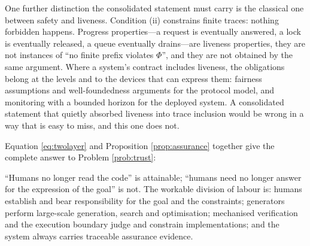 One further distinction the consolidated statement must carry is the classical one between safety and
liveness. Condition (ii) constrains finite traces: nothing forbidden happens. Progress properties---a
request is eventually answered, a lock is eventually released, a queue eventually drains---are
liveness properties, they are not instances of ``no finite prefix violates $\Phi$'', and they are not
obtained by the same argument. Where a system's contract includes liveness, the obligations belong at
the levels and to the devices that can express them: fairness assumptions and well-foundedness
arguments for the protocol model, and monitoring with a bounded horizon for the deployed system. A
consolidated statement that quietly absorbed liveness into trace inclusion would be wrong in a way
that is easy to miss, and this one does not.

Equation \eqref{eq:twolayer} and Proposition \ref{prop:assurance} together give the complete
answer to Problem \ref{prob:trust}:

\begin{principle}\label{pr:answer}
``Humans no longer read the code'' is attainable; ``humans need no longer answer for the
expression of the goal'' is not. The workable division of labour is: humans establish and
bear responsibility for the goal and the constraints; generators perform large-scale
generation, search and optimisation; mechanised verification and the execution boundary
judge and constrain implementations; and the system always carries traceable assurance
evidence.
\end{principle}

